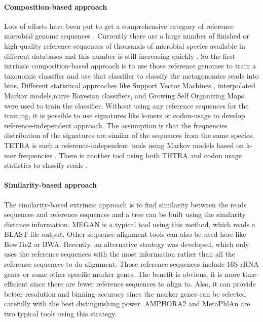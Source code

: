 \paragraph{Composition-based approach}
Lots of efforts have been put to get a comprehensive category of reference microbial genome sequences \cite{HMScience, Wu:2009aa}.
Currently there are a large number of finished or high-quality reference sequences of thousands of microbial species available in 
different databases and this number is still increasing quickly \cite{Markowitz:2012aa, Glass:2010aa, Wang:2007aa}.
So the first intrinsic composition-based approach is to use those reference genomes 
to train a taxonomic classifier and use that classifier to classify the metagenomics reads into bins.
Different statistical approaches like Support Vector Machines \cite{Patil:2012aa}, interpolated Markov models\cite{Brady:2011aa},naive Bayesian classifiers,
and Growing Self Organizing Maps \cite{Rosen:2011aa} were used to train the classifier.
Without using any reference sequences for the training, it is possible to use signatures 
like k-mers or codon-usage to develop reference-independent approach. The assumption is that 
the frequencies distribution of the signatures are similar of the sequences from the same
species. TETRA is such a reference-independent tools using Markov models based on k-mer frequencies \cite{Teeling:2004aa}.
There is another tool using both TETRA and codon usage statistics to classify reads \cite{Tzahor:2009aa}.


\paragraph{Similarity-based approach}
The similarity-based extrinsic approach is to find similarity between the reads sequences and reference sequences and 
a tree can be built using the similarity distance information. MEGAN \cite{Huson:2007aa} is a typical tool using this method,
which reads a BLAST file output. Other sequence alignment tools can also be used here like BowTie2 or BWA. Recently,
an alternative strategy was developed, which only uses the reference sequences with the most information rather than all the reference 
sequences to do alignment. Those reference sequences include 16S rRNA genes or some other specific marker genes. 
The benefit is obvious, it is more time-efficient since there are fewer reference sequences to align to. Also, it can
provide better resolution and binning accuracy since the marker genes can be selected carefully with the best distinguishing power.
AMPHORA2 \cite{Wu:2012aa} and MetaPhlAn \cite{Segata:2012aa} are two typical tools using this strategy.



